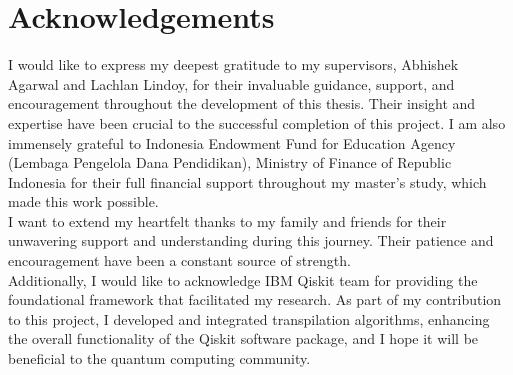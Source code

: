 \chapter*{Acknowledgements}

I would like to express my deepest gratitude to my supervisors, Abhishek Agarwal and Lachlan Lindoy, for their invaluable guidance, support, and encouragement throughout the development of this thesis. Their insight and expertise have been crucial to the successful completion of this project. I am also immensely grateful to Indonesia Endowment Fund for Education Agency (Lembaga Pengelola Dana Pendidikan), Ministry of Finance of Republic Indonesia for their full financial support throughout my master's study, which made this work possible. \\
I want to extend my heartfelt thanks to my family and friends for their unwavering support and understanding during this journey. Their patience and encouragement have been a constant source of strength. \\
Additionally, I would like to acknowledge IBM Qiskit team for providing the foundational framework that facilitated my research. As part of my contribution to this project, I developed and integrated transpilation algorithms, enhancing the overall functionality of the Qiskit software package, and I hope it will be beneficial to the quantum computing community.